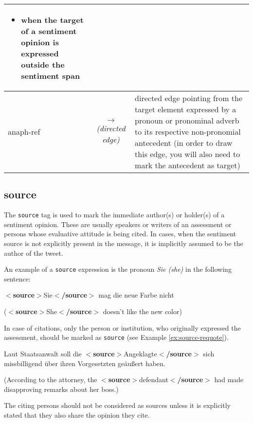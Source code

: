 \documentclass[11pt,a4paper]{article}
\newcommand{\xmltag}[1]{{\textbf{\small$<$#1$>$}}}
\newcommand{\source}[1]{\xmltag{source}#1\xmltag{/source}}
\newlength\clmnwidth
\newenvironment{myexe}{
  \begin{exe}
    \ex\begin{center}
    \itshape
}{
    \end{center}
  \end{exe}
}
\begin{document}
\begin{center}
\begin{tabular}{|l|c|p{\clmnwidth}|}
\begin{itemize}
    \item when the target of a sentiment opinion is expressed outside
      the sentiment span
    \end{itemize}\\\hline

    anaph-ref & \textit{$\longrightarrow$\newline(directed edge)} &
    directed edge pointing from the target element expressed by a
    pronoun or pronominal adverb to its respective non-pronomial
    antecedent (in order to draw this edge, you will also need to mark
    the antecedent as target)\\\hline
  \end{tabular}
\end{center}

\subsection{source}
The \texttt{source} tag is used to mark the immediate author(s) or
holder(s) of a sentiment opinion.  These are usually speakers or
writers of an assessment or persons whose evaluative attitude is being
cited.  In cases, when the sentiment source is not explicitly present
in the message, it is implicitly assumed to be the author of the
tweet.

An example of a \texttt{source} expression is the pronoun \textit{Sie
  (she)} in the following sentence:
\begin{myexe}
  \source{Sie} mag die neue Farbe nicht

  (\source{She} doesn't like the new color)
\end{myexe}

In case of citations, only the person or institution, who originally
expressed the assessment, should be marked as \texttt{source} (see
Example \ref{ex:source-requote}).
\begin{myexe}
  Laut Staatsanwalt soll die \source{Angeklagte} sich missbilligend \"uber
  ihren Vorgesetzten ge\"au\ss{}ert haben.

  (According to the attorney, the \source{defendant} had made disapproving
  remarks about her boss.)\label{ex:source-requote}
\end{myexe}
The citing persons should not be considered as sources unless it is
explicitly stated that they also share the opinion they cite.
\end{document}
